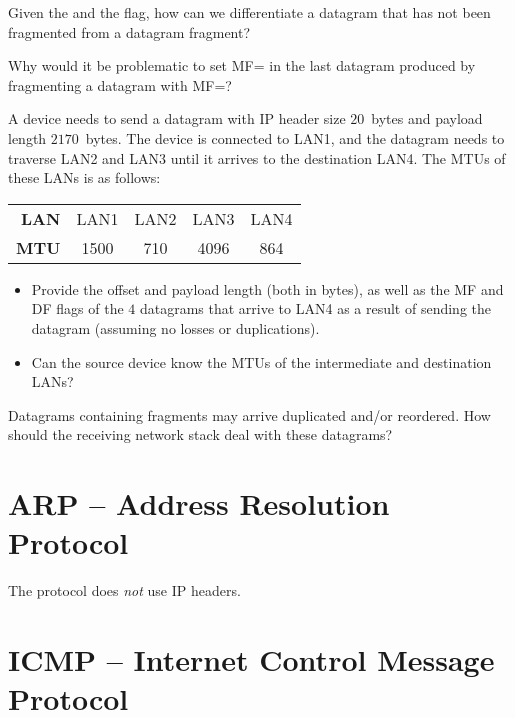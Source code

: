 \begin{exercise}
Given the  and the  flag, how can we differentiate 
a datagram that has not been fragmented from a datagram fragment?
\end{exercise}

\begin{exercise}
Why would it be problematic to set MF= in the last datagram 
produced by fragmenting a datagram with MF=?
\end{exercise}

\begin{exercise}
A device needs to send a datagram with IP header size $20$~bytes and payload length $2170$~bytes.
The device is connected to LAN1, and the datagram needs to traverse 
LAN2 and LAN3 until it arrives to the destination LAN4. The MTUs of these LANs is as follows:
\begin{center}
\begin{tabular}{r cccc}
\toprule
\textbf{LAN} & LAN1 & LAN2 & LAN3 & LAN4 \\
\textbf{MTU} & 1500 & 710  & 4096 & 864  \\
\bottomrule
\end{tabular}
\end{center}

\begin{itemize}
\item Provide the offset and payload length (both in bytes),
 as well as the MF and DF flags of the $4$ datagrams
 that arrive to LAN4 as a result of sending the datagram
 (assuming no losses or duplications).
  
\item Can the source device know the MTUs of the intermediate and destination 
LANs?
\end{itemize}

\end{exercise}


\begin{exercise}
Datagrams containing fragments may arrive duplicated and/or reordered. 
How should the receiving network stack deal with these datagrams?
\end{exercise}


\section{ARP -- Address Resolution Protocol}\label{sec:layer3:arp}
\begin{remark}
The  protocol does \textit{not} use IP headers.
\end{remark}

\section{ICMP -- Internet Control Message Protocol}\label{ßec:layer3:icmp}


